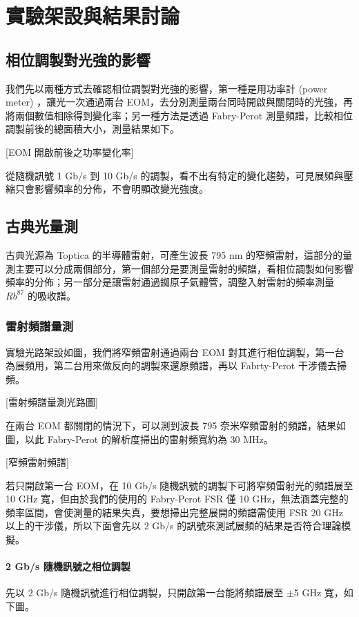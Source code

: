 \documentclass[class=NCU_thesis, crop=false]{standalone}
\begin{document}
\chapter{實驗架設與結果討論}

\section{相位調製對光強的影響}
我們先以兩種方式去確認相位調製對光強的影響，第一種是用功率計 (power meter) ，讓光一次通過兩台 EOM，去分別測量兩台同時開啟與關閉時的光強，再將兩個數值相除得到變化率；另一種方法是透過 Fabry-Perot 測量頻譜，比較相位調製前後的總面積大小，測量結果如下。

[EOM 開啟前後之功率變化率]

從隨機訊號 1 Gb/s 到 10 Gb/s 的調製，看不出有特定的變化趨勢，可見展頻與壓縮只會影響頻率的分佈，不會明顯改變光強度。

\section{古典光量測}
古典光源為 Toptica 的半導體雷射，可產生波長 795 nm 的窄頻雷射，這部分的量測主要可以分成兩個部分，第一個部分是要測量雷射的頻譜，看相位調製如何影響頻率的分佈；另一部分是讓雷射通過銣原子氣體管，調整入射雷射的頻率測量 $Rb^{87}$ 的吸收譜。

\subsection{雷射頻譜量測}

實驗光路架設如圖，我們將窄頻雷射通過兩台 EOM 對其進行相位調製，第一台為展頻用，第二台用來做反向的調製來還原頻譜，再以 Fabrty-Perot 干涉儀去掃頻。

[雷射頻譜量測光路圖]

在兩台 EOM 都關閉的情況下，可以測到波長 795 奈米窄頻雷射的頻譜，結果如圖，以此 Fabry-Perot 的解析度掃出的雷射頻寬約為 30 MHz。

[窄頻雷射頻譜]

若只開啟第一台 EOM，在 10 Gb/s 隨機訊號的調製下可將窄頻雷射光的頻譜展至 10 GHz 寬，但由於我們的使用的 Fabry-Perot FSR 僅 10 GHz，無法涵蓋完整的頻率區間，會使測量的結果失真，要想掃出完整展開的頻譜需使用 FSR 20 GHz 以上的干涉儀，所以下面會先以 2 Gb/s 的訊號來測試展頻的結果是否符合理論模擬。

\subsubsection{2 Gb/s 隨機訊號之相位調製}
先以 2 Gb/s 隨機訊號進行相位調製，只開啟第一台能將頻譜展至 $\pm$5 GHz 寬，如下圖。
\end{document}

